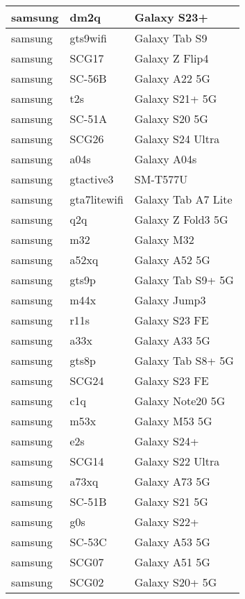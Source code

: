 \begin{tabularx}{\linewidth}{|l|X|X|}
        samsung & dm2q & Galaxy S23+ \\ \hline
        samsung & gts9wifi & Galaxy Tab S9 \\ \hline
        samsung & SCG17 & Galaxy Z Flip4 \\ \hline
        samsung & SC-56B & Galaxy A22 5G \\ \hline
        samsung & t2s & Galaxy S21+ 5G \\ \hline
        samsung & SC-51A & Galaxy S20 5G \\ \hline
        samsung & SCG26 & Galaxy S24 Ultra \\ \hline
        samsung & a04s & Galaxy A04s \\ \hline
        samsung & gtactive3 & SM-T577U \\ \hline
        samsung & gta7litewifi & Galaxy Tab A7 Lite \\ \hline
        samsung & q2q & Galaxy Z Fold3 5G \\ \hline
        samsung & m32 & Galaxy M32 \\ \hline
        samsung & a52xq & Galaxy A52 5G \\ \hline
        samsung & gts9p & Galaxy Tab S9+ 5G \\ \hline
        samsung & m44x & Galaxy Jump3 \\ \hline
        samsung & r11s & Galaxy S23 FE \\ \hline
        samsung & a33x & Galaxy A33 5G \\ \hline
        samsung & gts8p & Galaxy Tab S8+ 5G \\ \hline
        samsung & SCG24 & Galaxy S23 FE \\ \hline
        samsung & c1q & Galaxy Note20 5G \\ \hline
        samsung & m53x & Galaxy M53 5G \\ \hline
        samsung & e2s & Galaxy S24+ \\ \hline
        samsung & SCG14 & Galaxy S22 Ultra \\ \hline
        samsung & a73xq & Galaxy A73 5G \\ \hline
        samsung & SC-51B & Galaxy S21 5G \\ \hline
        samsung & g0s & Galaxy S22+ \\ \hline
        samsung & SC-53C & Galaxy A53 5G \\ \hline
        samsung & SCG07 & Galaxy A51 5G \\ \hline
        samsung & SCG02 & Galaxy S20+ 5G \\ \hline

\end{tabularx}
